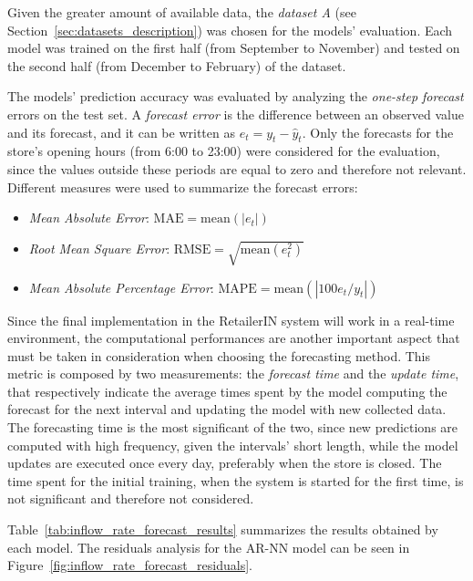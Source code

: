 Given the greater amount of available data, the \emph{dataset A} (see Section~\ref{sec:datasets_description}) was chosen for the models' evaluation. Each model was trained on the first half (from September to November) and tested on the second half (from December to February) of the dataset.

The models’ prediction accuracy was evaluated by analyzing the \emph{one-step forecast} errors on the test set. A \emph{forecast error} is the difference between an observed value and its forecast, and it can be written as \( e_t = y_t - \hat{y}_t \). Only the forecasts for the store’s opening hours (from 6:00 to 23:00) were considered for the evaluation, since the values outside these periods are equal to zero and therefore not relevant. Different measures were used to summarize the forecast errors:
\begin{itemize}
  \item \emph{Mean Absolute Error}: \( \text{MAE} = \text{mean}(| e_t |) \)
  \item \emph{Root Mean Square Error}: \( \text{RMSE} = \sqrt{\text{mean}(e_t^2)} \)
  \item \emph{Mean Absolute Percentage Error}: \( \text{MAPE} =  \text{mean}(| 100 e_t / y_t |) \)
\end{itemize}

Since the final implementation in the RetailerIN system will work in a real-time environment, the computational performances are another important aspect that must be taken in consideration when choosing the forecasting method. This metric is composed by two measurements: the \emph{forecast time} and the \emph{update time}, that respectively indicate the average times spent by the model computing the forecast for the next interval and updating the model with new collected data. The forecasting time is the most significant of the two, since new predictions are computed with high frequency, given the intervals’ short length, while the model updates are executed once every day, preferably when the store is closed. The time spent for the initial training, when the system is started for the first time, is not significant and therefore not considered.

Table~\ref{tab:inflow_rate_forecast_results} summarizes the results obtained by each model. The residuals analysis for the AR-NN model can be seen in Figure~\ref{fig:inflow_rate_forecast_residuals}.

